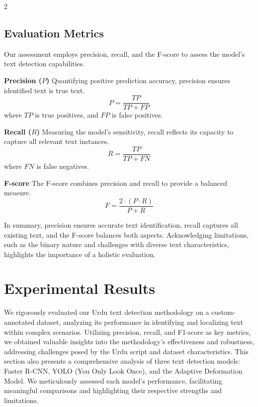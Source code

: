 \documentclass[sn-mathphys,Numbered]{sn-jnl}%
\begin{document}
\begin{multicols}{2}
\subsection{Evaluation Metrics}

Our assessment employs precision, recall, and the F-score to assess the model's text detection capabilities.

\textbf{Precision (\(P\))}
Quantifying positive prediction accuracy, precision ensures identified text is true text. 
\begin{equation}
	P = \frac{TP}{TP + FP}
\end{equation} 
where \( TP \) is true positives, and \( FP \) is false positives.

\textbf{Recall (\(R\))}
Measuring the model's sensitivity, recall reflects its capacity to capture all relevant text instances.
\begin{equation}
	R = \frac{TP}{TP + FN}
\end{equation}
where \( FN \) is false negatives.
 
\textbf{F-score}
The F-score combines precision and recall to provide a balanced measure. 
\begin{equation}
	F = \frac{2 \cdot (P \cdot R)}{P + R}
\end{equation}

In summary, precision ensures accurate text identification, recall captures all existing text, and the F-score balances both aspects. Acknowledging limitations, such as the binary nature and challenges with diverse text characteristics, highlights the importance of a holistic evaluation.


\section{Experimental Results}
We rigorously evaluated our Urdu text detection methodology on a custom-annotated dataset, analyzing its performance in identifying and localizing text within complex scenarios. Utilizing precision, recall, and F1-score as key metrics, we obtained valuable insights into the methodology's effectiveness and robustness, addressing challenges posed by the Urdu script and dataset characteristics. This section also presents a comprehensive analysis of three text detection models: Faster R-CNN, YOLO (You Only Look Once), and the Adaptive Deformation Model. We meticulously assessed each model's performance, facilitating meaningful comparisons and highlighting their respective strengths and limitations.



\end{multicols}
\end{document}
